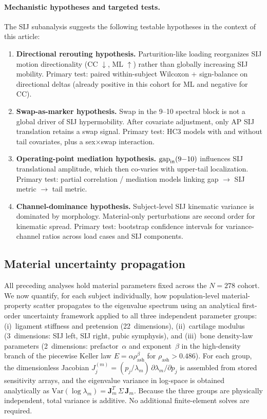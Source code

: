 \documentclass[11pt]{article}
\begin{document}
\paragraph{Mechanistic hypotheses and targeted tests.}
The SIJ subanalysis suggests the following testable hypotheses in the context of this article:
\begin{enumerate}[leftmargin=1.4em]
\item \textbf{Directional rerouting hypothesis.}
Parturition-like loading reorganizes SIJ motion directionality (CC $\downarrow$, ML $\uparrow$) rather than globally increasing SIJ mobility.
Primary test: paired within-subject Wilcoxon + sign-balance on directional deltas (already positive in this cohort for ML and negative for CC).
\item \textbf{Swap-as-marker hypothesis.}
Swap in the 9--10 spectral block is not a global driver of SIJ hypermobility.
After covariate adjustment, only AP SIJ translation retains a swap signal.
Primary test: HC3 models with and without tail covariates, plus a sex$\times$swap interaction.
\item \textbf{Operating-point mediation hypothesis.}
$\mathrm{gap}_{\rm in}(9{-}10)$ influences SIJ translational amplitude, which then co-varies with upper-tail localization.
Primary test: partial correlation / mediation models linking gap $\rightarrow$ SIJ metric $\rightarrow$ tail metric.
\item \textbf{Channel-dominance hypothesis.}
Subject-level SIJ kinematic variance is dominated by morphology.
Material-only perturbations are second order for kinematic spread.
Primary test: bootstrap confidence intervals for variance-channel ratios across load cases and SIJ components.
\end{enumerate}

\subsection{Material uncertainty propagation}
\label{sec:uq-results}

All preceding analyses hold material parameters fixed across the $N{=}278$ cohort.
We now quantify, for each subject individually, how population-level material-property scatter propagates to the eigenvalue spectrum using an analytical first-order uncertainty framework applied to all three independent parameter groups: (i)~ligament stiffness and pretension (22~dimensions), (ii)~cartilage modulus (3~dimensions: SIJ left, SIJ right, pubic symphysis), and (iii)~bone density-law parameters (2~dimensions: prefactor~$\alpha$ and exponent~$\beta$ in the high-density branch of the piecewise Keller law $E=\alpha\rho_{\mathrm{ash}}^{\beta}$ for $\rho_{\mathrm{ash}} > 0.486$).
For each group, the dimensionless Jacobian $J_j^{(m)}=(p_j/\lambda_m)\,\partial\lambda_m/\partial p_j$ is assembled from stored sensitivity arrays, and the eigenvalue variance in log-space is obtained analytically as $\mathrm{Var}(\log\lambda_m)=\mathbf{J}_m^T\,\Sigma\,\mathbf{J}_m$.
Because the three groups are physically independent, total variance is additive.
No additional finite-element solves are required.
\end{document}
